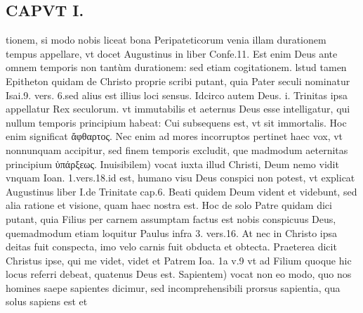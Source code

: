\documentclass{article}
\begin{document}
\begin{pages}
\section*{CAPVT I. }
\marginpar{[ p.31 ]}\pstart tionem, si modo nobis liceat bona Peripateticorum venia illam durationem tempus appellare, vt docet Augustinus in liber  Confe.11. Est enim Deus ante omnem temporis non tantùm durationem: sed etiam cogitationem. lstud tamen Epitheton quidam de Christo proprie scribi putant, quia Pater seculi nominatur Isai.9. vers. 6.sed alius est illius loci sensus. Idcirco autem Deus. i. Trinitas ipsa appellatur Rex seculorum. vt immutabilis et aeternus Deus esse intelligatur, qui nullum temporis principium habeat: Cui subsequens est, vt sit immortalis. Hoc enim significat ἄφθαρτος. Nec enim ad mores incorruptos pertinet haec vox, vt nonnunquam accipitur, sed finem temporis excludit, que madmodum aeternitas principium ὑπάρξεως.  \pend\pstart Inuisibilem) vocat iuxta illud Christi, Deum nemo vidit vnquam Ioan. 1.vers.18.id est, humano visu Deus conspici non potest, vt explicat Augustinus liber  I.de Trinitate cap.6. Beati quidem Deum vident et videbunt, sed alia ratione et visione, quam haec nostra est. Hoc de solo Patre quidam dici putant, quia Filius per carnem assumptam factus est nobis conspicuus Deus, quemadmodum etiam loquitur Paulus infra 3. vers.16. At nec in Christo ipsa deitas fuit conspecta, imo velo carnis fuit obducta et obtecta. Praeterea dicit Christus ipse, qui me videt, videt et Patrem Ioa. 1a v.9 vt ad Filium quoque hic locus referri debeat, quatenus Deus est.  \pend\pstart Sapientem) vocat non eo modo, quo nos homines saepe sapientes dicimur, sed incomprehensibili prorsus sapientia, qua solus sapiens est et  \pend

\end{pages}
\end{document}
